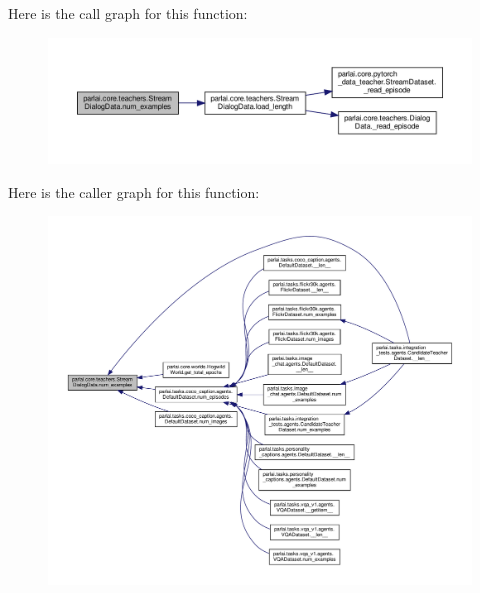 Here is the call graph for this function\+:
\nopagebreak
\begin{figure}[H]
\begin{center}
\leavevmode
\includegraphics[width=350pt]{classparlai_1_1core_1_1teachers_1_1StreamDialogData_ada385b7a8f549f4d65eb910b668c77e5_cgraph}
\end{center}
\end{figure}
Here is the caller graph for this function\+:
\nopagebreak
\begin{figure}[H]
\begin{center}
\leavevmode
\includegraphics[width=350pt]{classparlai_1_1core_1_1teachers_1_1StreamDialogData_ada385b7a8f549f4d65eb910b668c77e5_icgraph}
\end{center}
\end{figure}
\mbox{\label{classparlai_1_1core_1_1teachers_1_1StreamDialogData_a6375bd13d685da4b3449caaafcc5ec13}} 
